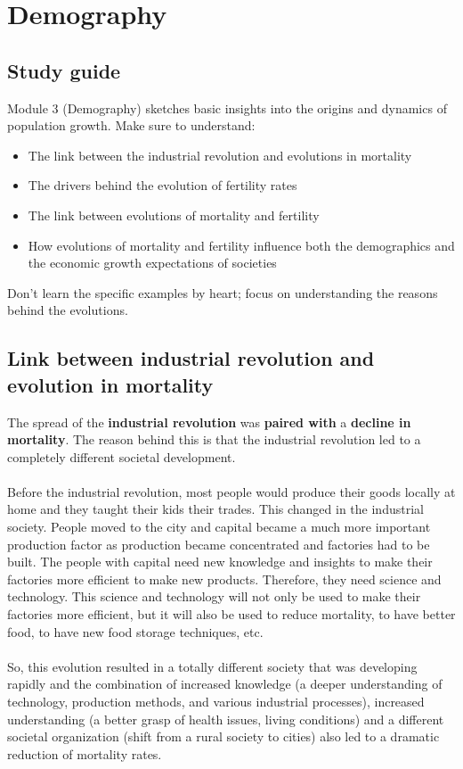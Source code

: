 \documentclass[../summary.tex]{subfiles}
\begin{document}
	
	\section{Demography}
	
	\subsection{Study guide}
	
	Module 3 (Demography) sketches basic insights into the origins and dynamics of population growth. Make sure to understand:
	\begin{itemize}
		\setlength{\itemsep}{0pt}
		\item The link between the industrial revolution and evolutions in mortality
		\item The drivers behind the evolution of fertility rates
		\item The link between evolutions of mortality and fertility
		\item How evolutions of mortality and fertility influence both the demographics and the economic
		growth expectations of societies
	\end{itemize}
	Don’t learn the specific examples by heart; focus on understanding the reasons behind the evolutions.
	
	\subsection{Link between industrial revolution and evolution in mortality}
	The spread of the \textbf{industrial revolution} was \textbf{paired with} a \textbf{decline in mortality}. The reason behind this is that the industrial revolution led to a completely different societal development. 
	\\
	\\
	Before the industrial revolution, most people would produce their goods locally at home and they taught their kids their trades. This changed in the industrial society. People moved to the city and capital became a much more important production factor as production became concentrated and factories had to be built. The people with capital need new knowledge and insights to make their factories more efficient to make new products. Therefore, they need science and technology. This science and technology will not only be used to make their factories more efficient, but it will also be used to reduce mortality, to have better food, to have new food storage techniques, etc. 
	\\
	\\
	So, this evolution resulted in a totally different society that was developing rapidly and the combination of increased knowledge (a deeper understanding of technology, production methods, and various industrial processes), increased understanding (a better grasp of health issues, living conditions) and a different societal organization (shift from a rural society to cities) also led to a dramatic reduction of mortality rates. 
	
\end{document}
